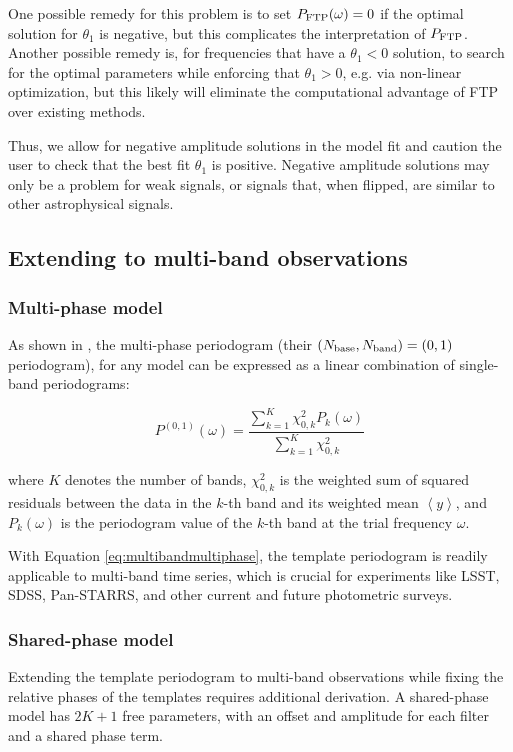 \documentclass[apj]{emulateapj}
\newcommand{\savg}[1]{\left<#1\right>}
\begin{document}
One possible remedy for this problem is to set $P_{\rm FTP}(\omega) = 0$ if the optimal
solution for $\theta_1$ is negative, but this complicates the interpretation of $P_{\rm FTP}$.
Another possible remedy is, for frequencies that have a $\theta_1 < 0$ solution, 
to search for the optimal parameters while enforcing that $\theta_1 > 0$,
e.g. via non-linear optimization, but this likely will eliminate the computational
advantage of FTP over existing methods.

Thus, we allow for negative amplitude solutions in the model fit and caution
the user to check that the best fit $\theta_1$ is positive. Negative amplitude
solutions may only be a problem for weak signals, or signals that, when flipped, 
are similar to other astrophysical signals.


\subsection{Extending to multi-band observations}

\subsubsection{Multi-phase model}
\label{sec:multiband}
As shown in \cite{Vanderplas+Ivezic_2015}, the multi-phase periodogram (their 
$(N_{\rm base}, N_{\rm band}) = (0, 1)$ periodogram), for any model can
be expressed as a linear combination of single-band periodograms:

\begin{equation}
\label{eq:multibandmultiphase}
P^{(0,1)}(\omega) = \frac{\sum_{k=1}^K\chi^2_{0, k}P_{k}(\omega)}{\sum_{k=1}^K\chi^2_{0,k}}
\end{equation} 

\noindent where $K$ denotes the number of bands, $\chi^2_{0,k}$ is the weighted sum of squared
residuals between the data in the $k$-th band and its weighted mean $\savg{y}$, and $P_k(\omega)$ is
the periodogram value of the $k$-th band at the trial frequency $\omega$. 

With Equation \ref{eq:multibandmultiphase}, the template periodogram is readily applicable to multi-band 
time series, which is crucial for experiments like LSST, SDSS, Pan-STARRS, and other current 
and future photometric surveys.

\subsubsection{Shared-phase model}
Extending the template periodogram to multi-band observations while fixing the
relative phases of the templates requires additional derivation. A shared-phase
model has $2K + 1$ free parameters, with an offset and amplitude for each filter 
and a shared phase term.
\end{document}
